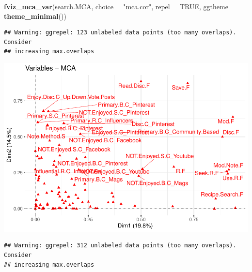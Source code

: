 \documentclass[
]{article}
\newenvironment{Shaded}{\begin{snugshade}}{\end{snugshade}}
\newcommand{\DataTypeTok}[1]{\textcolor[rgb]{0.13,0.29,0.53}{#1}}
\newcommand{\KeywordTok}[1]{\textcolor[rgb]{0.13,0.29,0.53}{\textbf{#1}}}
\newcommand{\NormalTok}[1]{#1}
\newcommand{\OtherTok}[1]{\textcolor[rgb]{0.56,0.35,0.01}{#1}}
\newcommand{\StringTok}[1]{\textcolor[rgb]{0.31,0.60,0.02}{#1}}
\begin{document}
\begin{Shaded}
\begin{Highlighting}[]
\KeywordTok{fviz_mca_var}\NormalTok{(search.MCA, }\DataTypeTok{choice =} \StringTok{"mca.cor"}\NormalTok{, }\DataTypeTok{repel =} \OtherTok{TRUE}\NormalTok{,}
             \DataTypeTok{ggtheme =} \KeywordTok{theme_minimal}\NormalTok{())}
\end{Highlighting}
\end{Shaded}

\begin{verbatim}
## Warning: ggrepel: 123 unlabeled data points (too many overlaps). Consider
## increasing max.overlaps
\end{verbatim}

\includegraphics{Average-User-MCA_files/figure-latex/diet yes all-2.pdf}

\begin{Shaded}
\end{Shaded}

\begin{verbatim}
## Warning: ggrepel: 312 unlabeled data points (too many overlaps). Consider
## increasing max.overlaps
\end{verbatim}
\end{document}
